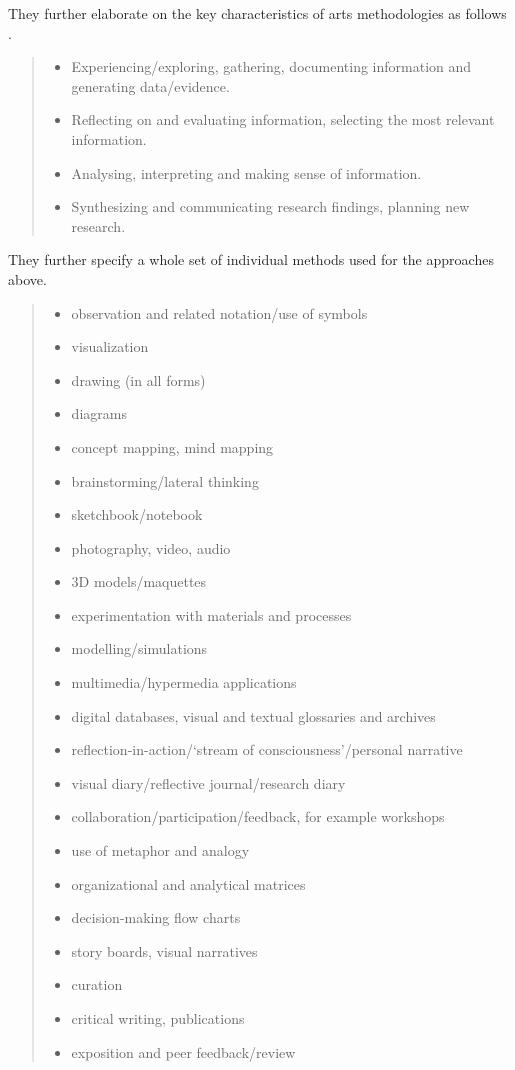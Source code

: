 They further elaborate on the key characteristics of arts methodologies as follows \autocite{Gray2004}.

\begin{quotation}
\begin{itemize}
  \item Experiencing/exploring, gathering, documenting information and generating data/evidence.
  \item Reflecting on and evaluating information, selecting the most relevant information.
  \item Analysing, interpreting and making sense of information.
  \item Synthesizing and communicating research findings, planning new research.
\end{itemize}
\end{quotation}

They further specify a whole set of individual methods used for the approaches above.

\begin{quotation}
\begin{itemize}
  \item observation and related notation/use of symbols
  \item visualization
  \item drawing (in all forms)
  \item diagrams
  \item concept mapping, mind mapping
  \item brainstorming/lateral thinking
  \item sketchbook/notebook
  \item photography, video, audio
  \item 3D models/maquettes
  \item experimentation with materials and processes
  \item modelling/simulations
  \item multimedia/hypermedia applications
  \item digital databases, visual and textual glossaries and archives
  \item reflection-in-action/`stream of consciousness'/personal narrative
  \item visual diary/reflective journal/research diary
  \item collaboration/participation/feedback, for example workshops
  \item use of metaphor and analogy
  \item organizational and analytical matrices
  \item decision-making flow charts
  \item story boards, visual narratives
  \item curation
  \item critical writing, publications
  \item exposition and peer feedback/review
\end{itemize}
\end{quotation}


